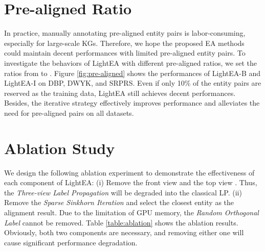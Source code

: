 \documentclass[11pt]{article}
\begin{document}
\section{Pre-aligned Ratio}
\label{sec:pre}
In practice, manually annotating pre-aligned entity pairs is labor-consuming, especially for large-scale KGs.
Therefore, we hope the proposed EA methods could maintain decent performances with limited pre-aligned entity pairs.
To investigate the behaviors of LightEA with different pre-aligned ratios, we set the ratios from  to .
Figure \ref{fig:pre-aligned} shows the  performances of LightEA-B and LightEA-I on DBP, DWYK, and SRPRS.
Even if only 10\% of the entity pairs are reserved as the training data, LightEA still achieves decent performances.
Besides, the iterative strategy effectively improves performance and alleviates the need for pre-aligned pairs on all datasets.

\section{Ablation Study}
\label{sec:able}
We design the following ablation experiment to demonstrate the effectiveness of each component of LightEA:
(i) Remove the front view  and the top view . Thus, the \emph{Three-view Label Propagation} will be degraded into the classical LP.
(ii) Remove the \emph{Sparse Sinkhorn Iteration} and select the closest entity as the alignment result.
Due to the limitation of GPU memory, the \emph{Random Orthogonal Label} cannot be removed.
Table \ref{table:ablation} shows the ablation results.
Obviously, both two components are necessary, and removing either one will cause significant performance degradation.

\begin{table}[b]
\renewcommand\arraystretch{1.2}
\caption{Ablation study of LightEA.}
\label{table:ablation}
\end{table}
\end{document}
